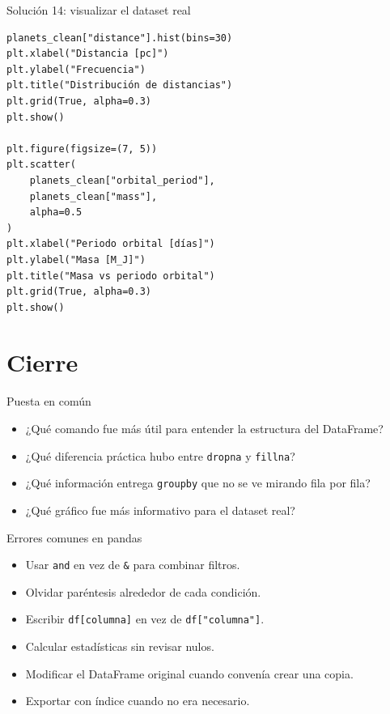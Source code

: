 \documentclass[10pt]{beamer}
\begin{document}
\begin{solutionblock}
\begin{frame}[fragile,shrink=5]{Solución 14: visualizar el dataset real}
\begin{verbatim}
planets_clean["distance"].hist(bins=30)
plt.xlabel("Distancia [pc]")
plt.ylabel("Frecuencia")
plt.title("Distribución de distancias")
plt.grid(True, alpha=0.3)
plt.show()

plt.figure(figsize=(7, 5))
plt.scatter(
    planets_clean["orbital_period"],
    planets_clean["mass"],
    alpha=0.5
)
plt.xlabel("Periodo orbital [días]")
plt.ylabel("Masa [M_J]")
plt.title("Masa vs periodo orbital")
plt.grid(True, alpha=0.3)
plt.show()
\end{verbatim}
\end{frame}
\end{solutionblock}

\section{Cierre}

\begin{frame}{Puesta en común}
  \begin{itemize}
    \item ¿Qué comando fue más útil para entender la estructura del DataFrame?
    \item ¿Qué diferencia práctica hubo entre \texttt{dropna} y \texttt{fillna}?
    \item ¿Qué información entrega \texttt{groupby} que no se ve mirando fila por fila?
    \item ¿Qué gráfico fue más informativo para el dataset real?
  \end{itemize}
\end{frame}

\begin{frame}{Errores comunes en pandas}
  \begin{itemize}
    \item Usar \texttt{and} en vez de \texttt{\&} para combinar filtros.
    \item Olvidar paréntesis alrededor de cada condición.
    \item Escribir \texttt{df[columna]} en vez de \texttt{df["columna"]}.
    \item Calcular estadísticas sin revisar nulos.
    \item Modificar el DataFrame original cuando convenía crear una copia.
    \item Exportar con índice cuando no era necesario.
  \end{itemize}
\end{frame}
\end{document}

